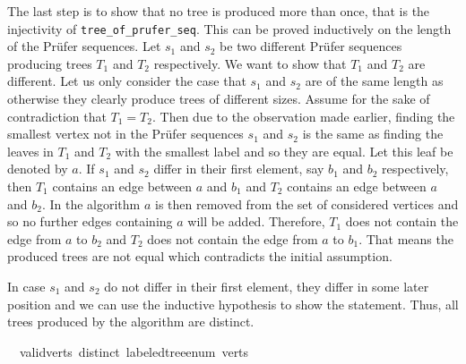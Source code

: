 The last step is to show that no tree is produced more than once, that is the injectivity of \texttt{tree\_of\_prufer\_seq}.
This can be proved inductively on the length of the Prüfer sequences.
Let $s_1$ and $s_2$ be two different Prüfer sequences producing trees $T_1$ and $T_2$ respectively.
We want to show that $T_1$ and $T_2$ are different.
Let us only consider the case that $s_1$ and $s_2$ are of the same length as otherwise they clearly produce trees of different sizes.
Assume for the sake of contradiction that $T_1 = T_2$.
Then due to the observation made earlier, finding the smallest vertex not in the Prüfer sequences $s_1$ and $s_2$ is the same as finding the leaves in $T_1$ and $T_2$ with the smallest label and so they are equal.
Let this leaf be denoted by $a$.
If $s_1$ and $s_2$ differ in their first element, say $b_1$ and $b_2$ respectively, then $T_1$ contains an edge between $a$ and $b_1$ and $T_2$ contains an edge between $a$ and $b_2$.
In the algorithm $a$ is then removed from the set of considered vertices and so no further edges containing $a$ will be added.
Therefore, $T_1$ does not contain the edge from $a$ to $b_2$ and $T_2$ does not contain the edge from $a$ to $b_1$.
That means the produced trees are not equal which contradicts the initial assumption.

In case $s_1$ and $s_2$ do not differ in their first element, they differ in some later position and we can use the inductive hypothesis to show the statement.
Thus, all trees produced by the algorithm are distinct.

\begin{isabellebox}
    \isamarkupfalse%
    \ {\isacharparenleft}{\kern0pt}\ valid{\isacharunderscore}{\kern0pt}verts{\isacharparenright}{\kern0pt}\ {\isachardoublequoteopen}distinct\ {\isacharparenleft}{\kern0pt}labeled{\isacharunderscore}{\kern0pt}tree{\isacharunderscore}{\kern0pt}enum\ verts{\isacharparenright}{\kern0pt}{\isachardoublequoteclose}
\end{isabellebox}
